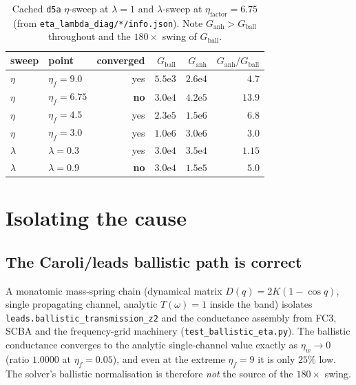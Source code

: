 \begin{table}[t]
  \centering
  \caption{Cached \texttt{d5a} $\eta$-sweep at $\lambda=1$ and $\lambda$-sweep at
    $\eta_\text{factor}=6.75$ (from \texttt{eta\_lambda\_diag/*/info.json}). Note
    $G_\text{anh}>G_\text{ball}$ throughout and the $180\times$ swing of
    $G_\text{ball}$.}
  \label{tab:diag_eta}
  \begin{tabular}{llrrrr}
    \toprule
    sweep & point & converged & $G_\text{ball}$ & $G_\text{anh}$ & $G_\text{anh}/G_\text{ball}$\\
    \midrule
    $\eta$ & $\eta_f{=}9.0$    & yes & $5.5\mathrm{e}3$ & $2.6\mathrm{e}4$ & $4.7$\\
    $\eta$ & $\eta_f{=}6.75$   & \textbf{no} & $3.0\mathrm{e}4$ & $4.2\mathrm{e}5$ & $13.9$\\
    $\eta$ & $\eta_f{=}4.5$    & yes & $2.3\mathrm{e}5$ & $1.5\mathrm{e}6$ & $6.8$\\
    $\eta$ & $\eta_f{=}3.0$    & yes & $1.0\mathrm{e}6$ & $3.0\mathrm{e}6$ & $3.0$\\
    $\lambda$ & $\lambda{=}0.3$ & yes & $3.0\mathrm{e}4$ & $3.5\mathrm{e}4$ & $1.15$\\
    $\lambda$ & $\lambda{=}0.9$ & \textbf{no} & $3.0\mathrm{e}4$ & $1.5\mathrm{e}5$ & $5.0$\\
    \bottomrule
  \end{tabular}
\end{table}

\section{Isolating the cause}
\label{sec:diag_isolate}

\subsection{The Caroli/leads ballistic path is correct}
\label{sec:diag_chain}

A monatomic mass-spring chain (dynamical matrix $D(q)=2K(1-\cos q)$, single
propagating channel, analytic $T(\omega)=1$ inside the band) isolates
\texttt{leads.ballistic\_transmission\_z2} and the conductance assembly from FC3,
SCBA and the frequency-grid machinery
(\texttt{test\_ballistic\_eta.py}). The ballistic conductance converges to the
analytic single-channel value exactly as $\eta_w\!\to\!0$ (ratio $1.0000$ at
$\eta_f=0.05$), and even at the extreme $\eta_f=9$ it is only $25\%$ low. The
solver's ballistic normalisation is therefore \emph{not} the source of the
$180\times$ swing.


